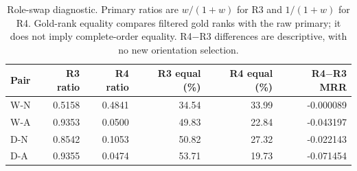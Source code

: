 \begin{table}[htbp]
\centering\small
\setlength{\tabcolsep}{4pt}
\caption{Role-swap diagnostic. Primary ratios are $w/(1+w)$ for R3 and $1/(1+w)$ for R4. Gold-rank equality compares filtered gold ranks with the raw primary; it does not imply complete-order equality. R4$-$R3 differences are descriptive, with no new orientation selection.}
\label{tab:dyna-roles}
\begin{tabular}{lrrrrr}
\toprule
Pair & R3 ratio & R4 ratio & R3 equal (\%) & R4 equal (\%) & R4$-$R3 MRR\\
\midrule
W-N & 0.5158 & 0.4841 & 34.54 & 33.99 & -0.000089\\
W-A & 0.9353 & 0.0500 & 49.83 & 22.84 & -0.043197\\
D-N & 0.8542 & 0.1053 & 50.82 & 27.32 & -0.022143\\
D-A & 0.9355 & 0.0474 & 53.71 & 19.73 & -0.071454\\
\bottomrule
\end{tabular}
\end{table}
